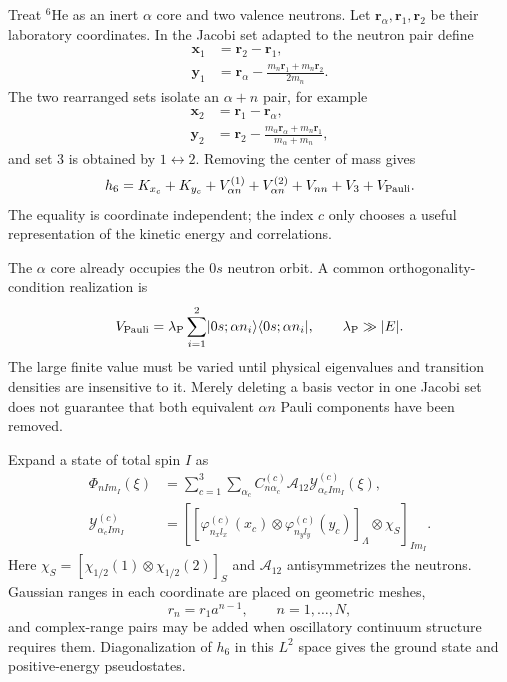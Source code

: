 Treat $^6$He as an inert $\alpha$ core and two valence neutrons.  Let
$\bm r_\alpha,\bm r_1,\bm r_2$ be their laboratory coordinates.  In the
Jacobi set adapted to the neutron pair define
\begin{align}
  \bm x_1&=\bm r_2-\bm r_1,
  \label{eq:he6-jacobi-nn-x}\\
  \bm y_1&=\bm r_\alpha-
  \frac{m_n\bm r_1+m_n\bm r_2}{2m_n}.
  \label{eq:he6-jacobi-nn-y}
\end{align}
The two rearranged sets isolate an $\alpha+n$ pair, for example
\begin{align}
  \bm x_2&=\bm r_1-\bm r_\alpha,
  \label{eq:he6-jacobi-an-x}\\
  \bm y_2&=\bm r_2-
  \frac{m_\alpha\bm r_\alpha+m_n\bm r_1}{m_\alpha+m_n},
  \label{eq:he6-jacobi-an-y}
\end{align}
and set 3 is obtained by $1\leftrightarrow2$.  Removing the center of mass
gives
\begin{equation}
  h_6
  =K_{x_c}+K_{y_c}
  +V_{\alpha n}^{(1)}+V_{\alpha n}^{(2)}+V_{nn}+V_3+V_{\mathrm{Pauli}}.
  \label{eq:he6-internal-hamiltonian}
\end{equation}
The equality is coordinate independent; the index $c$ only chooses a useful
representation of the kinetic energy and correlations.

The $\alpha$ core already occupies the $0s$ neutron orbit.  A common
orthogonality-condition realization is
\begin{equation}
  V_{\mathrm{Pauli}}
  =\lambda_{\mathrm P}
  \sum_{i=1}^{2}\lvert 0s;\alpha n_i \rangle
  \langle 0s;\alpha n_i \rvert,
  \qquad
  \lambda_{\mathrm P}\gg |E|.
  \label{eq:he6-ocm-projector}
\end{equation}
The large finite value must be varied until physical eigenvalues and
transition densities are insensitive to it.  Merely deleting a basis vector
in one Jacobi set does not guarantee that both equivalent $\alpha n$ Pauli
components have been removed.

Expand a state of total spin $I$ as
\begin{align}
  \Phi_{nIm_I}(\xi)
  &=\sum_{c=1}^{3}\sum_{\alpha_c}
  C_{n\alpha_c}^{(c)}
  \mathcal A_{12}\mathcal Y_{\alpha_cIm_I}^{(c)}(\xi),
  \label{eq:he6-gem-expansion}
  \\
  \mathcal Y_{\alpha_cIm_I}^{(c)}
  &=\left[
    [\varphi_{n_xl_x}^{(c)}(x_c)
     \otimes\varphi_{n_yl_y}^{(c)}(y_c)]_{\Lambda}
    \otimes\chi_S
  \right]_{Im_I}.
  \label{eq:he6-gem-channel-function}
\end{align}
Here $\chi_S=[\chi_{1/2}(1)\otimes\chi_{1/2}(2)]_S$ and
$\mathcal A_{12}$ antisymmetrizes the neutrons.  Gaussian ranges in
each coordinate are placed on geometric meshes,
\begin{equation}
  r_n=r_1a^{n-1},
  \qquad n=1,\ldots,N,
  \label{eq:he6-gaussian-ranges}
\end{equation}
and complex-range pairs may be added when oscillatory continuum structure
requires them.  Diagonalization of $h_6$ in this $L^2$ space gives the ground
state and positive-energy pseudostates.

